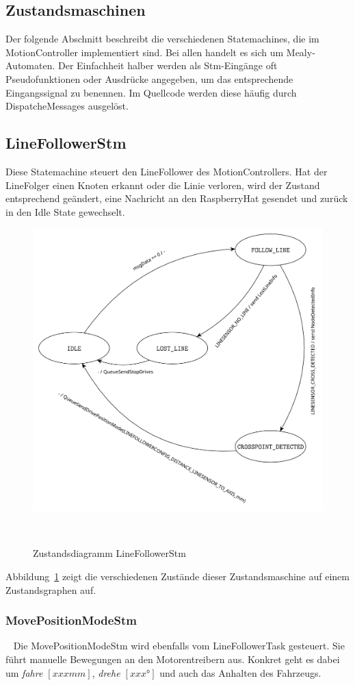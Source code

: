 \documentclass[main.tex]{subfiles} %
\begin{document}
\subsection{Zustandsmaschinen}
Der folgende Abschnitt beschreibt die verschiedenen Statemachines, die im
MotionController implementiert sind. Bei allen handelt es sich um
Mealy-Automaten. Der Einfachheit halber werden als Stm-Eingänge oft
Pseudofunktionen oder Ausdrücke angegeben, um das entsprechende Eingangssignal
zu benennen. Im Quellcode werden diese häufig durch DispatcheMessages
ausgelöst.

\subsection*{LineFollowerStm}
Diese Statemachine steuert den LineFollower des MotionControllers. Hat der
LineFolger einen Knoten erkannt oder die Linie verloren, wird der Zustand
entsprechend geändert, eine Nachricht an den RaspberryHat gesendet und zurück
in den Idle State gewechselt.

\begin{figure}[H]
    \centering
    \includegraphics[width=0.75\linewidth]{./fig_Firmware_MotionController/LineFollowerStm.pdf}
    \caption{Zustandsdiagramm LineFollowerStm}~\label{fig:LineFollowerStm}
\end{figure}

Abbildung~\ref{fig:LineFollowerStm} zeigt die verschiedenen Zustände dieser
Zustandsmaschine auf einem Zustandsgraphen auf.

\subsubsection*{MovePositionModeStm}~\label{apdx:MovePositionModeStm}
Die MovePositionModeStm wird ebenfalls vom LineFollowerTask gesteuert. Sie führt manuelle Bewegungen an den Motorentreibern aus.
Konkret geht es dabei um \textit{fahre $[xxx mm]$}, \textit{drehe $[xxx °]$} und auch das Anhalten des Fahrzeugs.
\end{document}
